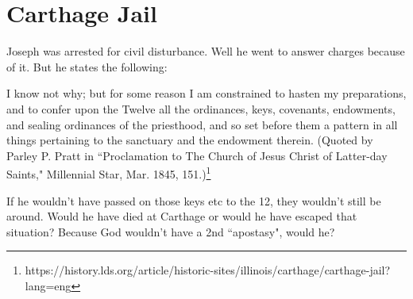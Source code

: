 \section{Carthage Jail}

Joseph was arrested for civil disturbance. Well he went to answer charges
because of it. But he states the following:
\begin{displayquote}
I know not why; but for some reason I am constrained to hasten my  preparations, 
and to confer upon the Twelve all the ordinances, keys,  covenants, endowments, 
and sealing ordinances of the priesthood, and so  set before them a pattern in 
all things pertaining to the sanctuary and  the endowment therein. (Quoted by 
Parley P. Pratt in ``Proclamation to  The Church of Jesus Christ of Latter-day 
Saints," Millennial Star, Mar. 1845, 151.)\footnote{
https://history.lds.org/article/historic-sites/illinois/carthage/carthage-jail?lang=eng
}
\end{displayquote}

If he wouldn't have passed on those keys etc to the 12, they wouldn't still be 
around. Would he have died at Carthage or would he have escaped that situation? 
Because God wouldn't have a 2nd ``apostasy", would he?